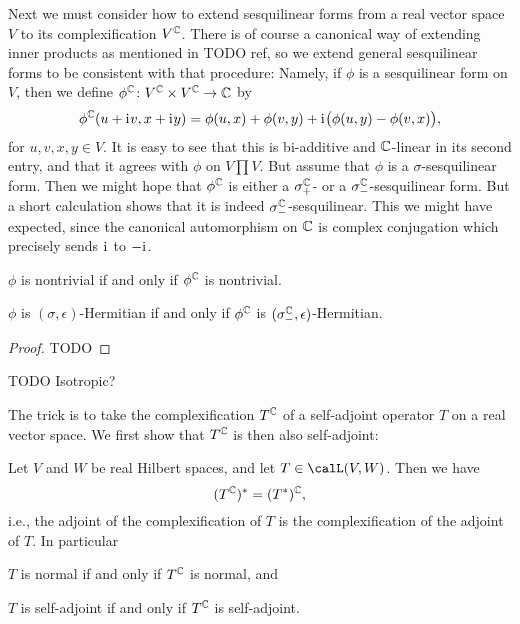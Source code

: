 Next we must consider how to extend sesquilinear forms from a real vector space $V$ to its complexification $V^{\mathbb{C}}$. There is of course a canonical way of extending inner products as mentioned in TODO ref, so we extend general sesquilinear forms to be consistent with that procedure: Namely, if $\phi$ is a sesquilinear form on $V$, then we define $\phi^\complex \colon V^\complex \prod V^\complex \to \complex$ by
%
\begin{equation*}
    \phi^\complex(u + \iu v, x + \iu y)
        = \phi(u,x) + \phi(v,y) + \iu \bigl( \phi(u,y) - \phi(v,x) \bigr),
\end{equation*}
%
for $u,v,x,y \in V$. It is easy to see that this is bi-additive and $\mathbb{C}$-linear in its second entry, and that it agrees with $\phi$ on $V \prod V$. But assume that $\phi$ is a $\sigma$-sesquilinear form. Then we might hope that $\phi^\complex$ is either a $\sigma^{\mathbb{C}}_+$- or a $\sigma^{\mathbb{C}}_-$-sesquilinear form. But a short calculation shows that it is indeed $\sigma^{\mathbb{C}}_-$-sesquilinear. This we might have expected, since the canonical automorphism on $\mathbb{C}$ is complex conjugation which precisely sends $\mathrm{i}\mkern1mu$ to $-\mathrm{i}\mkern1mu$.

\begin{proposition}
    \begin{enumproposition}
        \item $\phi$ is nontrivial if and only if $\phi^\complex$ is nontrivial.
        \item $\phi$ is $(\sigma,\epsilon)$-Hermitian if and only if $\phi^\complex$ is $(\sigma^{\mathbb{C}}_-,\epsilon)$-Hermitian.
    \end{enumproposition}
\end{proposition}

\begin{proof}
    TODO
\end{proof}


\begin{proposition}
    TODO Isotropic?
\end{proposition}


The trick is to take the complexification $T^{\mathbb{C}}$ of a self-adjoint operator $T$ on a real vector space. We first show that $T^{\mathbb{C}}$ is then also self-adjoint:

\begin{proposition}
    \label{prop:complexification-adjoint}
    Let $V$ and $W$ be real Hilbert spaces, and let $T \in \lin(V,W)$. Then we have
    \begin{equation*}
        (T^{\mathbb{C}})^*
            = (T^*)^{\mathbb{C}},
    \end{equation*}
    i.e., the adjoint of the complexification of $T$ is the complexification of the adjoint of $T$. In particular
    \begin{enumproposition}
        \item $T$ is normal if and only if $T^{\mathbb{C}}$ is normal, and
        \item $T$ is self-adjoint if and only if $T^{\mathbb{C}}$ is self-adjoint.
    \end{enumproposition}
\end{proposition}

